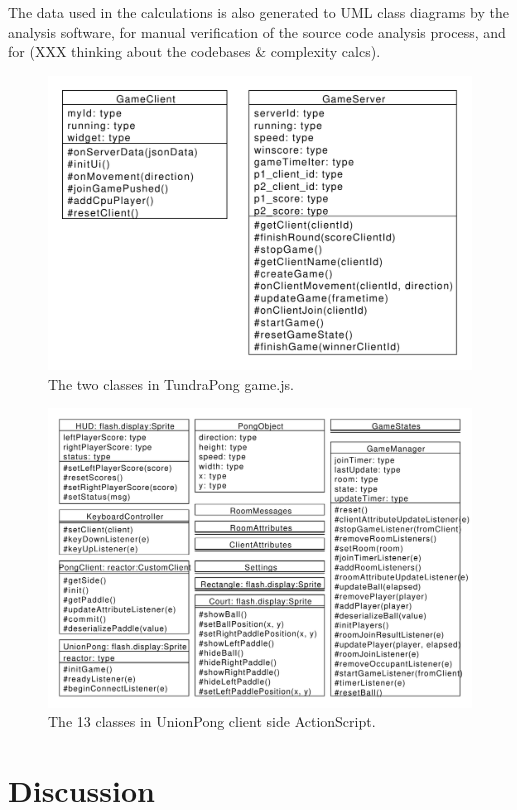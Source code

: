 \documentclass[conference]{IEEEtran}
\begin{document}
The data used in the calculations is also generated to UML class
diagrams by the analysis software, for manual verification of the
source code analysis process, and for (XXX thinking about the
codebases \& complexity calcs).
\begin{figure}
\includegraphics[scale=0.400000]{pics/TundraPong.pdf}
\caption{The two classes in TundraPong game.js.}
\end{figure}
\begin{figure}
\includegraphics[scale=0.350000]{pics/UnionPong-manuallayout.pdf}
\caption{The 13 classes in UnionPong client side ActionScript.}
\end{figure}


\section{Discussion%
  \label{discussion}%
}
\end{document}
